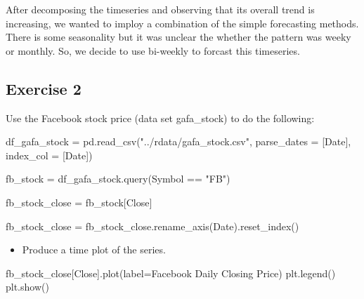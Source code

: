 \documentclass[
  11pt,
]{article}
\newenvironment{Shaded}{\begin{snugshade}}{\end{snugshade}}
\newcommand{\NormalTok}[1]{\textcolor[rgb]{0.00,0.23,0.31}{#1}}
\newcommand{\OperatorTok}[1]{\textcolor[rgb]{0.37,0.37,0.37}{#1}}
\newcommand{\StringTok}[1]{\textcolor[rgb]{0.13,0.47,0.30}{#1}}
\providecommand{\tightlist}{%
  \setlength{\itemsep}{0pt}\setlength{\parskip}{0pt}}\usepackage{longtable,booktabs,array}
\begin{document}
After decomposing the timeseries and observing that its overall trend is
increasing, we wanted to imploy a combination of the simple forecasting
methods. There is some seasonality but it was unclear the whether the
pattern was weeky or monthly. So, we decide to use bi-weekly to forcast
this timeseries.

\subsection{Exercise 2}\label{exercise-2}

Use the Facebook stock price (data set gafa\_stock) to do the following:

\begin{Shaded}
\begin{Highlighting}[]
\NormalTok{df\_gafa\_stock }\OperatorTok{=}\NormalTok{ pd.read\_csv(}\StringTok{"../rdata/gafa\_stock.csv"}\NormalTok{, parse\_dates }\OperatorTok{=}\NormalTok{ [}\StringTok{\textquotesingle{}Date\textquotesingle{}}\NormalTok{], index\_col }\OperatorTok{=}\NormalTok{ [}\StringTok{\textquotesingle{}Date\textquotesingle{}}\NormalTok{])}

\NormalTok{fb\_stock }\OperatorTok{=}\NormalTok{ df\_gafa\_stock.query(}\StringTok{\textquotesingle{}Symbol == "FB"\textquotesingle{}}\NormalTok{)}

\NormalTok{fb\_stock\_close }\OperatorTok{=}\NormalTok{ fb\_stock[}\StringTok{\textquotesingle{}Close\textquotesingle{}}\NormalTok{]}

\NormalTok{fb\_stock\_close }\OperatorTok{=}\NormalTok{ fb\_stock\_close.rename\_axis(}\StringTok{\textquotesingle{}Date\textquotesingle{}}\NormalTok{).reset\_index()}
\end{Highlighting}
\end{Shaded}

\begin{itemize}
\tightlist
\item
  Produce a time plot of the series.
\end{itemize}

\begin{Shaded}
\begin{Highlighting}[]
\NormalTok{fb\_stock\_close[}\StringTok{\textquotesingle{}Close\textquotesingle{}}\NormalTok{].plot(label}\OperatorTok{=}\StringTok{\textquotesingle{}Facebook Daily Closing Price\textquotesingle{}}\NormalTok{)}
\NormalTok{plt.legend()}
\NormalTok{plt.show()}
\end{Highlighting}
\end{Shaded}
\end{document}
